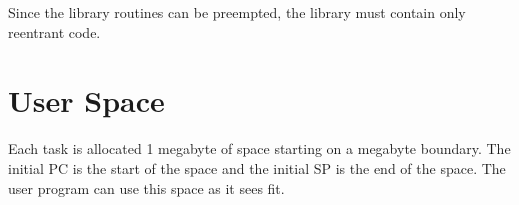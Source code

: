 \documentclass[10pt]{article}
\begin{document}
Since the library routines can be preempted, the library must contain only reentrant code.

\section{User Space}
Each task is allocated 1 megabyte of space starting on a megabyte boundary.  The initial PC is the start of the space and the initial SP is the end of the space.  The user program can use this space as it sees fit.
\end{document}
